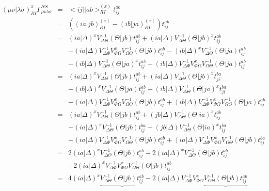 \documentclass[fleqn,12pt]{article}
\newcommand{\bra}{<\!}
\newcommand{\ket}{\!>}
\newcommand{\tijab}{{t_{ij}^{ab}}}
\newcommand{\tjiba}{{t_{ji}^{ba}}}
\newcommand{\tijba}{{t_{ij}^{ba}}}
\newcommand{\intari}[2]{\bra #1 || #2 \ket_{RI}}
\newcommand{\intmri}[2]{( #1 | #2 )_{RI}}
\begin{document}
\begin{changebar}
\begin{eqnarray}
\intmri{\mu \nu}{\lambda \sigma}^{x} \Gamma^{NS}_{\mu\nu\lambda\sigma}
   & = & \intari{ij}{ab}^{(x)} \tijab \\
   & = & ( \intmri{ia}{jb}^{(x)} - \intmri{ib}{ja}^{(x)} ) \tijab \\
   & = & (i a | \Delta)^{x} V^{-1}_{\Delta\Theta} (\Theta | j b) \tijab
       + (i a | \Delta) V^{-1}_{\Delta\Theta} (\Theta | j b)^{x} \tijab\nonumber \\
   &   & - (i a | \Delta) V^{-1}_{\Delta\Phi} V^{x}_{\Phi\Omega}
             V^{-1}_{\Omega\Theta} (\Theta | j b) \tijab
         - (i b | \Delta)^{x} V^{-1}_{\Delta\Theta} (\Theta | j a) \tijab\nonumber \\
   &  &- (i b | \Delta) V^{-1}_{\Delta\Theta} (\Theta | j a)^{x} \tijab
       + (i b | \Delta) V^{-1}_{\Delta\Phi} V^{x}_{\Phi\Omega}
             V^{-1}_{\Omega\Theta} (\Theta | j a)                \tijab \\
   & = & (i a | \Delta)^{x} V^{-1}_{\Delta\Theta} (\Theta | j b) \tijab
       + (i a | \Delta) V^{-1}_{\Delta\Theta} (\Theta | j b)^{x} \tjiba\nonumber \\
   &&   - (i b | \Delta)^{x} V^{-1}_{\Delta\Theta} (\Theta | j a) \tijab
     - (i b | \Delta) V^{-1}_{\Delta\Theta} (\Theta | j a)^{x} \tjiba\nonumber \\
   & & - (i a | \Delta) V^{-1}_{\Delta\Phi} V^{x}_{\Phi\Omega}
             V^{-1}_{\Omega\Theta} (\Theta | j b) \tijab
       + (i b | \Delta) V^{-1}_{\Delta\Phi} V^{x}_{\Phi\Omega}
             V^{-1}_{\Omega\Theta} (\Theta | j a)                \tijab \\
   & = & (i a | \Delta)^{x} V^{-1}_{\Delta\Theta} (\Theta | j b) \tijab
       + (jb | \Delta) V^{-1}_{\Delta\Theta} (\Theta | ia)^{x} \tijab\nonumber \\
   & &   - (i a | \Delta)^{x} V^{-1}_{\Delta\Theta} (\Theta | j b) \tijba
     - (j b | \Delta) V^{-1}_{\Delta\Theta} (\Theta | i a)^{x} \tijba\nonumber \\
  & & - (i a | \Delta) V^{-1}_{\Delta\Phi} V^{x}_{\Phi\Omega}
             V^{-1}_{\Omega\Theta} (\Theta | j b) \tijab
       + (i a | \Delta) V^{-1}_{\Delta\Phi} V^{x}_{\Phi\Omega}
             V^{-1}_{\Omega\Theta} (\Theta | j b)                \tijba \\
   & = & 2 (i a | \Delta)^{x} V^{-1}_{\Delta\Theta} (\Theta | j b) \tijab
       + 2 (i a | \Delta)^{x} V^{-1}_{\Delta\Theta} (\Theta | j b) \tijab\nonumber \\
   &&    - 2 (i a | \Delta)^{x} V^{-1}_{\Delta\Phi} V^{x}_{\Phi\Omega}
             V^{-1}_{\Omega\Theta} (\Theta | j b) \tijab \\
   & = & 4 (i a | \Delta)^{x} 
           \underbrace{V^{-1}_{\Delta\Theta} (\Theta | j b) \tijab}
       - 2 (i a | \Delta) V^{-1}_{\Delta\Phi} V^{x}_{\Phi\Omega}
             \underbrace{V^{-1}_{\Omega\Theta} (\Theta | j b) \tijab}
\end{eqnarray}


\end{changebar}
\end{document}
